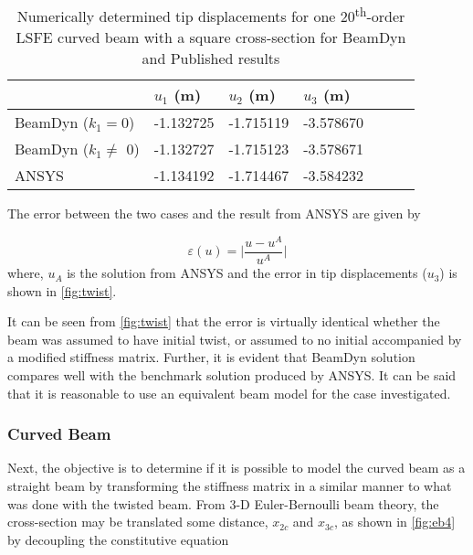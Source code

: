 \documentclass[letterpaper,12pt]{article}
\begin{document}
\begin{table}
\caption{\label{tab:twist2}Numerically determined tip displacements for one 20\textsuperscript{th}-order LSFE  curved beam with a square cross-section for BeamDyn and Published results } 
\begin{center} 
    \begin{tabular}{| l | l | l | l | l | l | l |}
    	\hline
    	        & $u_1$ (m) & $u_2$ (m) & $u_3$ (m)  \\ \hline
    	BeamDyn ($k_1 = 0$) & -1.132725
    	     & -1.715119       & -3.578670      \\  \hline
    	BeamDyn ($k_1 \neq$ 0) & -1.132727     & -1.715123       & -3.578671      \\  \hline
    	ANSYS   & -1.134192     & -1.714467      & -3.584232     \\ \hline
    \end{tabular}
\end{center}
\end{table} 

The error between the two cases and the result from ANSYS are given by

\begin{equation}
\label{eq. 5.7a}
\varepsilon(u)=\bigg|\frac{u-u^A}{u^A}\bigg|
\end{equation}
where, $u_A$ is the solution from ANSYS and the error in tip displacements ($u_3$) is shown in \ref{fig:twist}.


It can be seen from \ref{fig:twist} that the error is virtually identical whether the beam was assumed to have initial twist, or assumed to no initial accompanied by a modified stiffness matrix. Further, it is evident that BeamDyn solution compares well with the benchmark solution produced by ANSYS. It can be said that it is reasonable to use an equivalent beam model for the case investigated.

\subsubsection{Curved Beam}
Next, the objective is to determine if it is possible to model the curved beam as a straight beam by transforming the stiffness matrix in a similar manner to what was done with the twisted beam. From 3-D Euler-Bernoulli \cite{unYu} beam theory, the cross-section may be translated some distance, $x_{2c}$ and $x_{3c}$, as shown in \ref{fig:eb4} by decoupling the constitutive equation
\end{document}
